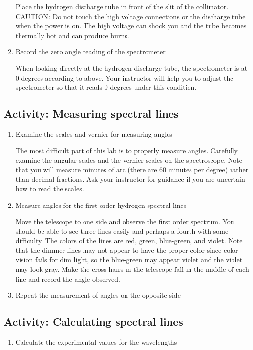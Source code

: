 \begin{multicols}{2}
\begin{enumerate}
	Place the hydrogen discharge tube in front of the slit of the collimator.  CAUTION:  Do not touch the high voltage connections or the discharge tube when the power is on.  The high voltage can shock you and the tube becomes thermally hot and can produce burns.
	
	\item Record the zero angle reading of the spectrometer
	
	When looking directly at the hydrogen discharge tube, the spectrometer is at 0 degrees according to   above.  Your instructor will help you to adjust the spectrometer so that it reads 0 degrees under this condition.
\end{enumerate}

\subsection{Activity: Measuring spectral lines}
\begin{enumerate}
	\item Examine the scales and vernier for measuring angles
	
	The most difficult part of this lab is to properly measure angles.  Carefully examine the angular scales and the vernier scales on the spectroscope.  Note that you will measure minutes of arc (there are 60 minutes per degree) rather than decimal fractions.  Ask your instructor for guidance if you are uncertain how to read the scales.
	\item Measure angles for the first order hydrogen spectral lines
	
	Move the telescope to one side and observe the first order spectrum.  You should be able to see three lines easily and perhaps a fourth with some difficulty.  The colors of the lines are red, green, blue-green, and violet.  Note that the dimmer lines may not appear to have the proper color since color vision fails for dim light, so the blue-green may appear violet and the violet may look gray.  Make the cross hairs in the telescope fall in the middle of each line and record the angle observed.
	\item Repeat the measurement of angles on the opposite side
\end{enumerate}
	
\subsection{Activity: Calculating spectral lines}
\begin{enumerate}
	\item Calculate the experimental values for the wavelengths
	

\end{enumerate}
\end{multicols}
